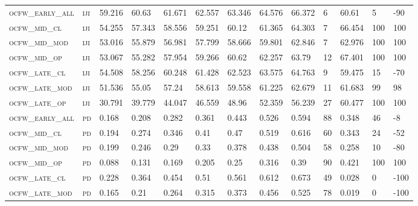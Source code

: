 \begin{landscape}
\begin{center}
\begin{footnotesize}
\begin{longtable}{lllllllllllll}
\textsc{ocfw\_early\_all} & \textsc{iji       }   & 59.216   & 60.63    & 61.671   & 62.557   & 63.346   & 64.576   & 66.372   & 6   & 60.61    & 5   & -90  \\
\textsc{ocfw\_mid\_cl   } & \textsc{iji       }   & 54.255   & 57.343   & 58.556   & 59.251   & 60.12    & 61.365   & 64.303   & 7   & 66.454   & 100 & 100  \\
\textsc{ocfw\_mid\_mod  } & \textsc{iji       }   & 53.016   & 55.879   & 56.981   & 57.799   & 58.666   & 59.801   & 62.846   & 7   & 62.976   & 100 & 100  \\
\textsc{ocfw\_mid\_op   } & \textsc{iji       }   & 53.067   & 55.282   & 57.954   & 59.266   & 60.62    & 62.257   & 63.79    & 12  & 67.401   & 100 & 100  \\
\textsc{ocfw\_late\_cl  } & \textsc{iji       }   & 54.508   & 58.256   & 60.248   & 61.428   & 62.523   & 63.575   & 64.763   & 9   & 59.475   & 15  & -70  \\
\textsc{ocfw\_late\_mod } & \textsc{iji       }   & 51.536   & 55.05    & 57.24    & 58.613   & 59.558   & 61.225   & 62.679   & 11  & 61.683   & 99  & 98   \\
\textsc{ocfw\_late\_op  } & \textsc{iji       }   & 30.791   & 39.779   & 44.047   & 46.559   & 48.96    & 52.359   & 56.239   & 27  & 60.477   & 100 & 100  \\
\textsc{ocfw\_early\_all} & \textsc{pd        }   & 0.168    & 0.208    & 0.282    & 0.361    & 0.443    & 0.526    & 0.594    & 88  & 0.348    & 46  & -8   \\
\textsc{ocfw\_mid\_cl   } & \textsc{pd        }   & 0.194    & 0.274    & 0.346    & 0.41     & 0.47     & 0.519    & 0.616    & 60  & 0.343    & 24  & -52  \\
\textsc{ocfw\_mid\_mod  } & \textsc{pd        }   & 0.199    & 0.246    & 0.29     & 0.33     & 0.378    & 0.438    & 0.504    & 58  & 0.258    & 10  & -80  \\
\textsc{ocfw\_mid\_op   } & \textsc{pd        }   & 0.088    & 0.131    & 0.169    & 0.205    & 0.25     & 0.316    & 0.39     & 90  & 0.421    & 100 & 100  \\
\textsc{ocfw\_late\_cl  } & \textsc{pd        }   & 0.228    & 0.364    & 0.454    & 0.51     & 0.561    & 0.612    & 0.673    & 49  & 0.028    & 0   & -100 \\
\textsc{ocfw\_late\_mod } & \textsc{pd        }   & 0.165    & 0.21     & 0.264    & 0.315    & 0.373    & 0.456    & 0.525    & 78  & 0.019    & 0   & -100 \\

\end{longtable}
\end{footnotesize}
\end{center}
\end{landscape}
